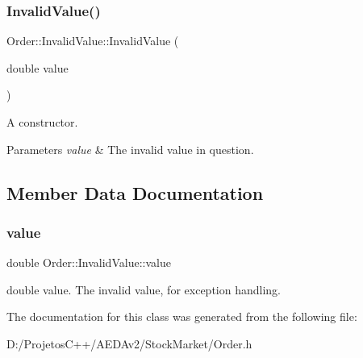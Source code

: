 \subsubsection{\texorpdfstring{Invalid\+Value()}{InvalidValue()}}
{\footnotesize\ttfamily Order\+::\+Invalid\+Value\+::\+Invalid\+Value (\begin{DoxyParamCaption}\item[{double}]{value }\end{DoxyParamCaption})\hspace{0.3cm}{\ttfamily [inline]}}

A constructor. 
\begin{DoxyParams}{Parameters}
{\em value} & The invalid value in question. \\
\hline
\end{DoxyParams}


\subsection{Member Data Documentation}
\mbox{\label{class_order_1_1_invalid_value_a6150353c94bbfcb14cf6b3cf0988a558}} 
\subsubsection{\texorpdfstring{value}{value}}
{\footnotesize\ttfamily double Order\+::\+Invalid\+Value\+::value\hspace{0.3cm}{\ttfamily [private]}}

double value. The invalid value, for exception handling. 

The documentation for this class was generated from the following file\+:\begin{DoxyCompactItemize}
\item 
D\+:/\+Projetos\+C++/\+A\+E\+D\+Av2/\+Stock\+Market/Order.\+h\end{DoxyCompactItemize}
